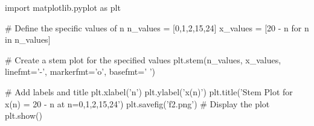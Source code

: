 import matplotlib.pyplot as plt

# Define the specific values of n
n_values = [0,1,2,15,24]
x_values = [20 - n for n in n_values]

# Create a stem plot for the specified values
plt.stem(n_values, x_values, linefmt='-', markerfmt='o', basefmt=' ')

# Add labels and title
plt.xlabel('n')
plt.ylabel('x(n)')
plt.title('Stem Plot for x(n) = 20 - n at n=0,1,2,15,24')
plt.savefig('f2.png')
# Display the plot
plt.show()
